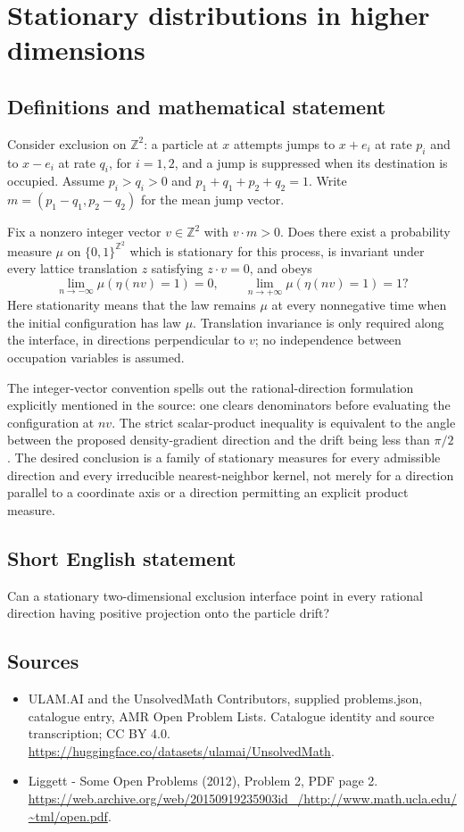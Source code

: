 \documentclass[11pt,a4paper]{article}
\begin{document}
\section*{Stationary distributions in higher dimensions}\label{statement}

\subsection{Definitions and mathematical statement}
Consider exclusion on $\mathbb Z^2$: a particle at $x$ attempts jumps to $x+e_i$ at rate $p_i$ and to $x-e_i$ at rate $q_i$, for $i=1,2$, and a jump is suppressed when its destination is occupied. Assume $p_i>q_i>0$ and $p_1+q_1+p_2+q_2=1$. Write $m=(p_1-q_1,p_2-q_2)$ for the mean jump vector.

Fix a nonzero integer vector $v\in\mathbb Z^2$ with $v\cdot m>0$. Does there exist a probability measure $\mu$ on $\{0,1\}^{\mathbb Z^2}$ which is stationary for this process, is invariant under every lattice translation $z$ satisfying $z\cdot v=0$, and obeys
\[
\lim_{n\to-\infty}\mu(\eta(nv)=1)=0,
\qquad
\lim_{n\to+\infty}\mu(\eta(nv)=1)=1?
\]
Here stationarity means that the law remains $\mu$ at every nonnegative time when the initial configuration has law $\mu$. Translation invariance is only required along the interface, in directions perpendicular to $v$; no independence between occupation variables is assumed.

The integer-vector convention spells out the rational-direction formulation explicitly mentioned in the source: one clears denominators before evaluating the configuration at $nv$. The strict scalar-product inequality is equivalent to the angle between the proposed density-gradient direction and the drift being less than $\pi/2$. The desired conclusion is a family of stationary measures for every admissible direction and every irreducible nearest-neighbor kernel, not merely for a direction parallel to a coordinate axis or a direction permitting an explicit product measure.
\subsection{Short English statement}
Can a stationary two-dimensional exclusion interface point in every rational direction having positive projection onto the particle drift?
\subsection{Sources}
\begin{itemize}
\item[S1] ULAM.AI and the UnsolvedMath Contributors, supplied problems.json, catalogue entry, AMR Open Problem Lists. Catalogue identity and source transcription; CC BY 4.0.
\url{https://huggingface.co/datasets/ulamai/UnsolvedMath}.
\item[S2] Liggett - Some Open Problems (2012), Problem 2, PDF page 2. 
\url{https://web.archive.org/web/20150919235903id_/http://www.math.ucla.edu/~tml/open.pdf}.
\end{itemize}
\end{document}
